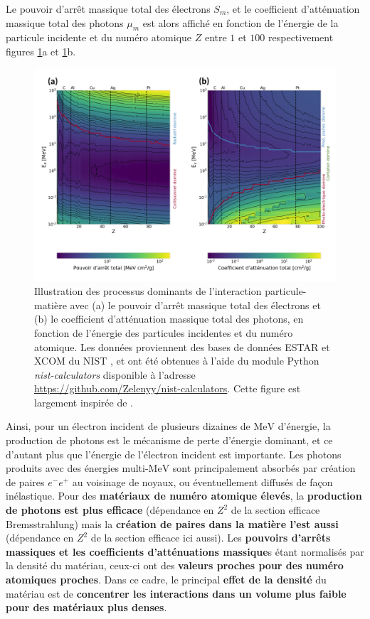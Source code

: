 \begin{refsection}
Le pouvoir d'arrêt massique total des électrons $S_m$, et le coefficient d'atténuation massique total des photons $\mu_m$ est alors affiché en fonction de l'énergie de la particule incidente et du numéro atomique $Z$ entre $1$ et $100$ respectivement figures \ref{fig:12-processus_matiere}a et  \ref{fig:12-processus_matiere}b.

\begin{figure}[t]
	\centering
	\includegraphics[width=\linewidth]{1-particules/processus_matiere.png}
	\caption{Illustration des processus dominants de l'interaction particule-matière avec (a) le pouvoir d'arrêt massique total des électrons et (b) le coefficient d'atténuation massique total des photons, en fonction de l'énergie des particules incidentes et du numéro atomique. Les données proviennent des bases de données ESTAR et XCOM du NIST \parencite{berger_1999,berger_1999a}, et ont été obtenues à l'aide du module Python \textit{nist-calculators} disponible à l'adresse \href{https://github.com/Zelenyy/nist-calculators}{https://github.com/Zelenyy/nist-calculators}. Cette figure est largement inspirée de \parencite{carron_2007}.}
	\label{fig:12-processus_matiere}
\end{figure}

Ainsi, pour un électron incident de plusieurs dizaines de $\si{\MeV}$ d'énergie, la production de photons est le mécanisme de perte d'énergie dominant, et ce d'autant plus que l'énergie de l'électron incident est importante. Les photons produits avec des énergies multi-$\si{\MeV}$ sont principalement absorbés par création de paires $e^-e^+$ au voisinage de noyaux, ou éventuellement diffusés de façon inélastique. Pour des \textbf{matériaux de numéro atomique élevés}, la \textbf{production de photons est plus efficace} (dépendance en $Z^2$ de la section efficace Bremsstrahlung) mais la \textbf{création de paires dans la matière l'est aussi} (dépendance en $Z^2$ de la section efficace ici aussi). Les \textbf{pouvoirs d'arrêts massiques et les coefficients d'atténuations massique}s étant normalisés par la densité du matériau, ceux-ci ont des \textbf{valeurs proches pour des numéro atomiques proches}. Dans ce cadre, le principal \textbf{effet de la densité} du matériau est de \textbf{concentrer les interactions dans un volume plus faible pour des matériaux plus denses}.


\newpage
\printbibliography[heading=subbibintoc]
\end{refsection}